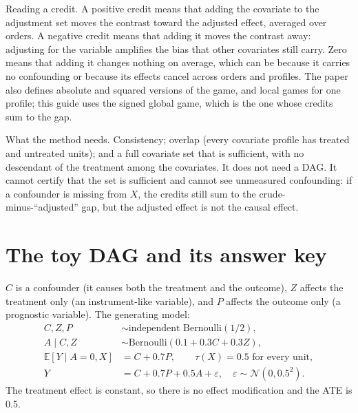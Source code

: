 \documentclass[10pt,letterpaper]{article}
\newcommand{\E}{\mathbb{E}}
\begin{document}
Reading a credit. A positive credit means that adding the covariate to the adjustment set moves the contrast toward the adjusted effect, averaged over orders. A negative credit means that adding it moves the contrast away: adjusting for the variable amplifies the bias that other covariates still carry. Zero means that adding it changes nothing on average, which can be because it carries no confounding or because its effects cancel across orders and profiles. The paper also defines absolute and squared versions of the game, and local games for one profile; this guide uses the signed global game, which is the one whose credits sum to the gap.

What the method needs. Consistency; overlap (every covariate profile has treated and untreated units); and a full covariate set that is sufficient, with no descendant of the treatment among the covariates. It does not need a DAG. It cannot certify that the set is sufficient and cannot see unmeasured confounding: if a confounder is missing from $X$, the credits still sum to the crude-minus-``adjusted'' gap, but the adjusted effect is not the causal effect.

\newpage
\section{The toy DAG and its answer key}
\begin{center}
\end{center}
$C$ is a confounder (it causes both the treatment and the outcome), $Z$ affects the treatment only (an instrument-like variable), and $P$ affects the outcome only (a prognostic variable). The generating model:
\begin{align*}
C, Z, P &\sim \text{independent Bernoulli}(1/2),\\
A \mid C, Z &\sim \text{Bernoulli}(0.1 + 0.3C + 0.3Z),\\
\E[Y \mid A=0, X] &= C + 0.7P, \qquad \tau(X) = 0.5 \text{ for every unit},\\
Y &= C + 0.7P + 0.5A + \varepsilon, \quad \varepsilon \sim \mathcal{N}(0, 0.5^2).
\end{align*}
The treatment effect is constant, so there is no effect modification and the ATE is 0.5.
\end{document}
